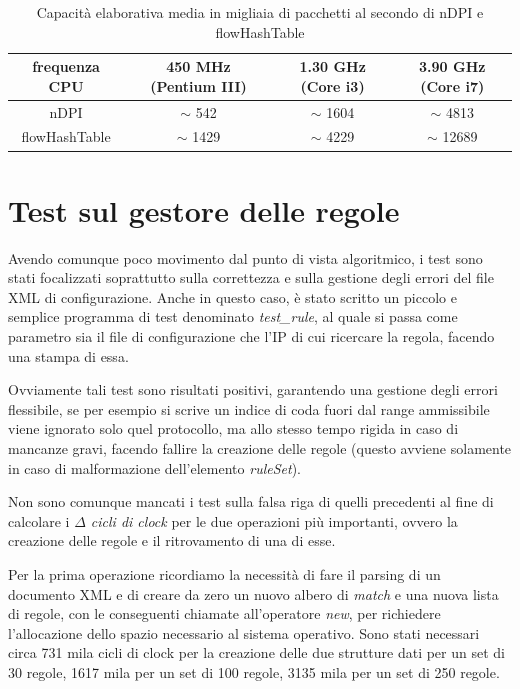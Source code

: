 \begin{table}[ht]
\begin{center}
\begin{tabular}{|c|c|c|c|}
\hline
frequenza CPU & 450 MHz (Pentium III) & 1.30 GHz (Core i3) & 3.90 GHz (Core i7) \\
\hline
nDPI & $\sim$ 542 & $\sim$ 1604 & $\sim$ 4813 \\
\hline
flowHashTable & $\sim$ 1429 & $\sim$ 4229 & $\sim$ 12689 \\
\hline
\end{tabular}
\caption{Capacità elaborativa media in migliaia di pacchetti al secondo di nDPI e flowHashTable}
\label{perf-ndpi-fht}
\end{center}
\end{table}

\section{Test sul gestore delle regole}

Avendo comunque poco movimento dal punto di vista algoritmico, i test sono stati focalizzati soprattutto sulla correttezza e sulla gestione degli errori del file XML di configurazione. Anche in questo caso, è stato scritto un piccolo e semplice programma di test denominato \emph{test\_rule}, al quale si passa come parametro sia il file di configurazione che l'IP di cui ricercare la regola, facendo una stampa di essa.

Ovviamente tali test sono risultati positivi, garantendo una gestione degli errori flessibile, se per esempio si scrive un indice di coda fuori dal range ammissibile viene ignorato solo quel protocollo, ma allo stesso tempo rigida in caso di mancanze gravi, facendo fallire la creazione delle regole (questo avviene solamente in caso di malformazione dell'elemento \emph{ruleSet}).

Non sono comunque mancati i test sulla falsa riga di quelli precedenti al fine di calcolare i \textit{$\Delta$ cicli di clock} per le due operazioni più importanti, ovvero la creazione delle regole e il ritrovamento di una di esse.

Per la prima operazione ricordiamo la necessità di fare il parsing di un documento XML e di creare da zero un nuovo albero di \emph{match} e una nuova lista di regole, con le conseguenti chiamate all'operatore \emph{new}, per richiedere l'allocazione dello spazio necessario al sistema operativo. Sono stati necessari circa 731 mila cicli di clock per la creazione delle due strutture dati per un set di 30 regole, 1617 mila per un set di 100 regole, 3135 mila per un set di 250 regole.

